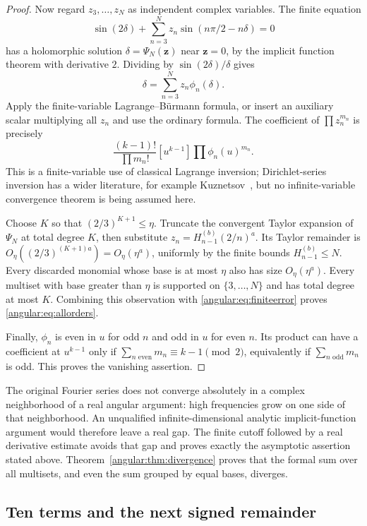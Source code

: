 \begin{proof}
Now regard $z_3,\ldots,z_N$ as independent complex variables. The
finite equation
\[
 \sin(2\delta)+\sum_{n=3}^Nz_n\sin(n\pi/2-n\delta)=0
\]
has a holomorphic solution $\delta=\Psi_N(\mathbf z)$ near
$\mathbf z=0$, by the implicit function theorem with derivative $2$.
Dividing by $\sin(2\delta)/\delta$ gives
\[
 \delta=\sum_{n=3}^Nz_n\phi_n(\delta).
\]
Apply the finite-variable Lagrange--B\"urmann formula, or insert an
auxiliary scalar multiplying all $z_n$ and use the ordinary formula.
The coefficient of $\prod z_n^{m_n}$ is precisely
\[
 \frac{(k-1)!}{\prod m_n!}
 [u^{k-1}]\prod\phi_n(u)^{m_n}.
\]
This is a finite-variable use of classical Lagrange inversion;
Dirichlet-series inversion has a wider literature, for example
Kuznetsov~\cite{Kuznetsov2019}, but no infinite-variable convergence
theorem is being assumed here.

Choose $K$ so that $(2/3)^{K+1}\leq\eta$. Truncate the convergent
Taylor expansion of $\Psi_N$ at total degree $K$, then substitute
$z_n=H_{n-1}^{(b)}(2/n)^a$. Its Taylor remainder is
$O_\eta((2/3)^{(K+1)a})=O_\eta(\eta^a)$, uniformly by the finite
bounds $H_{n-1}^{(b)}\leq N$. Every discarded monomial whose
base is at most $\eta$ also has size $O_\eta(\eta^a)$.
Every multiset with base greater than $\eta$ is supported on
$\{3,\ldots,N\}$ and has total degree at most $K$. Combining
this observation with \eqref{angular:eq:finiteerror} proves
\eqref{angular:eq:allorders}.

Finally, $\phi_n$ is even in $u$ for odd $n$ and odd in $u$ for
even $n$. Its product can have a coefficient at $u^{k-1}$ only if
$\sum_{n\text{ even}}m_n\equiv k-1\pmod2$, equivalently if
$\sum_{n\text{ odd}}m_n$ is odd. This proves the vanishing assertion.
\end{proof}

\begin{remark}
The original Fourier series does not converge absolutely in a complex
neighborhood of a real angular argument: high frequencies grow on
one side of that neighborhood. An unqualified infinite-dimensional
analytic implicit-function argument would therefore leave a real gap.
The finite cutoff followed by a real derivative estimate avoids that
gap and proves exactly the asymptotic assertion stated above. Theorem~\ref{angular:thm:divergence} proves that the formal sum over
all multisets, and even the sum grouped by equal bases, diverges.
\end{remark}

\subsection{Ten terms and the next signed remainder}

